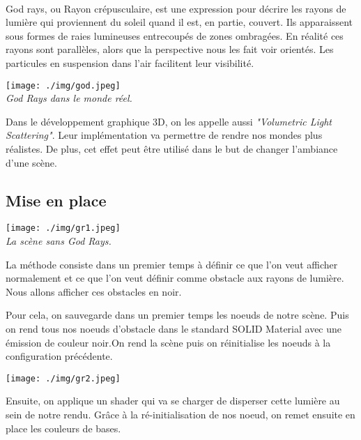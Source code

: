 \documentclass[a4paper]{article}
\begin{document}
\paragraph{}
God rays, ou Rayon crépusculaire, est une expression pour décrire les rayons de lumière qui proviennent du soleil quand il est, en partie, couvert. Ils apparaissent sous formes de raies lumineuses entrecoupés de zones ombragées.
En réalité ces rayons sont parallèles, alors que la perspective nous les fait voir orientés.
Les particules en suspension dans l'air facilitent leur visibilité.

\begin{center}
\texttt{[image: ./img/god.jpeg]}\\
\textit{God Rays dans le monde réel.}
\end{center}

Dans le développement graphique 3D, on les appelle aussi \textit{"Volumetric Light Scattering"}.
Leur implémentation va permettre de rendre nos mondes plus réalistes. De plus, cet effet peut être utilisé dans le but de changer l'ambiance d'une scène.

\subsection{Mise en place}
\vspace{0.3cm}
\begin{center}
\texttt{[image: ./img/gr1.jpeg]}\\
\textit{La scène sans God Rays.}
\end{center}

La méthode consiste dans un premier temps à définir ce que l'on veut afficher normalement et ce que l'on veut définir comme obstacle aux rayons de lumière. Nous allons afficher ces obstacles en noir.

Pour cela, on sauvegarde dans un premier temps les noeuds de notre scène. Puis on rend tous nos noeuds d'obstacle dans le standard SOLID Material avec une émission de couleur noir.On rend la scène puis on réinitialise les noeuds à la configuration précédente.

\begin{center}
\texttt{[image: ./img/gr2.jpeg]}
\end{center}

Ensuite, on applique un shader qui va se charger de disperser cette lumière au sein de notre rendu. Grâce à la ré-initialisation de nos noeud, on remet ensuite en place les couleurs de bases.
\end{document}
